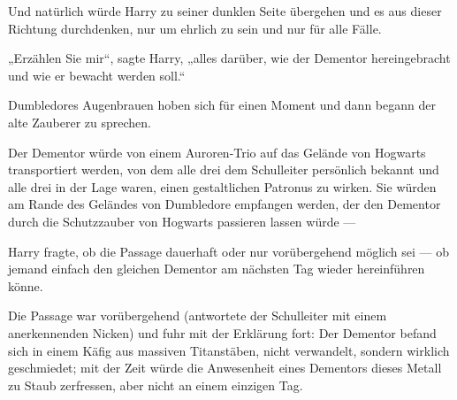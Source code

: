 Und natürlich würde Harry zu seiner dunklen Seite übergehen und es aus dieser Richtung durchdenken, nur um ehrlich zu sein und nur für alle Fälle.

„Erzählen Sie mir“, sagte Harry, „alles darüber, wie der Dementor hereingebracht und wie er bewacht werden soll.“

Dumbledores Augenbrauen hoben sich für einen Moment und dann begann der alte Zauberer zu sprechen.

Der Dementor würde von einem Auroren-Trio auf das Gelände von Hogwarts transportiert werden, von dem alle drei dem Schulleiter persönlich bekannt und alle drei in der Lage waren, einen gestaltlichen Patronus zu wirken. Sie würden am Rande des Geländes von Dumbledore empfangen werden, der den Dementor durch die Schutzzauber von Hogwarts passieren lassen würde —

Harry fragte, ob die Passage dauerhaft oder nur vorübergehend möglich sei — ob jemand einfach den gleichen Dementor am nächsten Tag wieder hereinführen könne.

Die Passage war vorübergehend (antwortete der Schulleiter mit einem anerkennenden Nicken) und fuhr mit der Erklärung fort: Der Dementor befand sich in einem Käfig aus massiven Titanstäben, nicht verwandelt, sondern wirklich geschmiedet; mit der Zeit würde die Anwesenheit eines Dementors dieses Metall zu Staub zerfressen, aber nicht an einem einzigen Tag.

